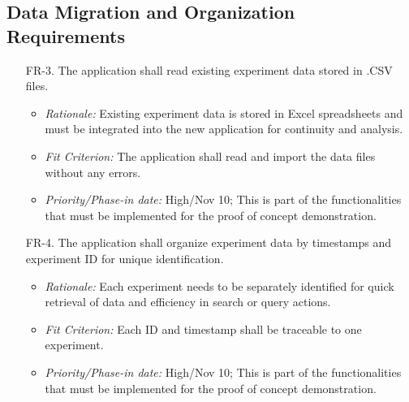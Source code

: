 \documentclass[12pt]{article}
\begin{document}
\subsection{Data Migration and Organization Requirements}
  \begin{enumerate}
    \item[FR-3.] The application shall read existing experiment data stored in .CSV files.
    \begin{itemize}
      \item \textit{Rationale:} Existing experiment data is stored in Excel spreadsheets and must be integrated into the new application for continuity and analysis.
      \item \textit{Fit Criterion:} The application shall read and import the data files without any errors.
      \item \textit{Priority/Phase-in date:} High/Nov 10; This is part of the functionalities that must be implemented for the proof of concept demonstration.
    \end{itemize}
    \item[FR-4.] The application shall organize experiment data by timestamps and experiment ID for unique identification.
    \begin{itemize}
      \item \textit{Rationale:} Each experiment needs to be separately identified for quick retrieval of data and efficiency in search or query actions.
      \item \textit{Fit Criterion:} Each ID and timestamp shall be traceable to one experiment.
      \item \textit{Priority/Phase-in date:} High/Nov 10; This is part of the functionalities that must be implemented for the proof of concept demonstration.
    \end{itemize}
  \end{enumerate}
\end{document}
